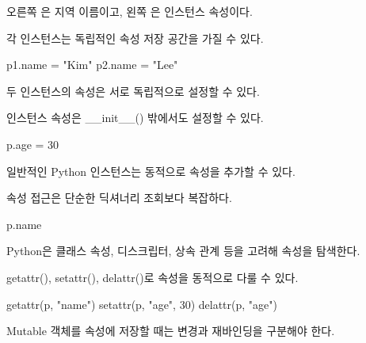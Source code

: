 오른쪽 은 지역 이름이고, 왼쪽 은 인스턴스 속성이다.

\begin{dhknote}
\begin{dhksmry}[centered]
각 인스턴스는 독립적인 속성 저장 공간을 가질 수 있다.
\end{dhksmry}
\end{dhknote}

\begin{dhkcode}
p1.name = "Kim"
p2.name = "Lee"
\end{dhkcode}

두 인스턴스의 속성은 서로 독립적으로 설정할 수 있다.

\begin{dhknote}
\begin{dhksmry}[centered]
인스턴스 속성은 __init__() 밖에서도 설정할 수 있다.
\end{dhksmry}
\end{dhknote}

\begin{dhkcode}
p.age = 30
\end{dhkcode}

일반적인 Python 인스턴스는 동적으로 속성을 추가할 수 있다.

\begin{dhknote}
\begin{dhksmry}[centered]
속성 접근은 단순한 딕셔너리 조회보다 복잡하다.
\end{dhksmry}
\end{dhknote}

\begin{dhkcode}
p.name
\end{dhkcode}

Python은 클래스 속성, 디스크립터, 상속 관계 등을 고려해 속성을 탐색한다.

\begin{dhknote}
\begin{dhksmry}[centered]
getattr(), setattr(), delattr()로 속성을 동적으로 다룰 수 있다.
\end{dhksmry}
\end{dhknote}

\begin{dhkcode}
getattr(p, "name")
setattr(p, "age", 30)
delattr(p, "age")
\end{dhkcode}

\begin{dhknote}
\begin{dhksmry}[centered]
Mutable 객체를 속성에 저장할 때는 변경과 재바인딩을 구분해야 한다.
\end{dhksmry}
\end{dhknote}

